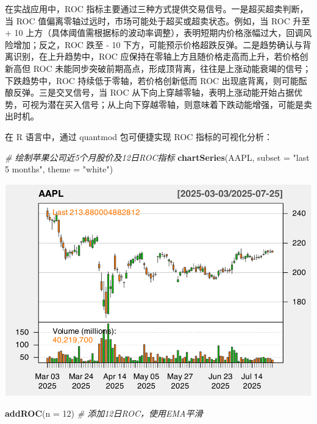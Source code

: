 \documentclass[]{ctexbook}
\newenvironment{Shaded}{\begin{snugshade}}{\end{snugshade}}
\newcommand{\AttributeTok}[1]{\textcolor[rgb]{0.13,0.29,0.53}{#1}}
\newcommand{\CommentTok}[1]{\textcolor[rgb]{0.56,0.35,0.01}{\textit{#1}}}
\newcommand{\DecValTok}[1]{\textcolor[rgb]{0.00,0.00,0.81}{#1}}
\newcommand{\FunctionTok}[1]{\textcolor[rgb]{0.13,0.29,0.53}{\textbf{#1}}}
\newcommand{\NormalTok}[1]{#1}
\newcommand{\StringTok}[1]{\textcolor[rgb]{0.31,0.60,0.02}{#1}}
\begin{document}
在实战应用中，ROC 指标主要通过三种方式提供交易信号。一是超买超卖判断，当 ROC 值偏离零轴过远时，市场可能处于超买或超卖状态。例如，当 ROC 升至 + 10 上方（具体阈值需根据标的波动率调整），表明短期内价格涨幅过大，回调风险增加；反之，ROC 跌至 - 10 下方，可能预示价格超跌反弹。二是趋势确认与背离识别，在上升趋势中，ROC 应保持在零轴上方且随价格走高而上升，若价格创新高但 ROC 未能同步突破前期高点，形成顶背离，往往是上涨动能衰竭的信号；下跌趋势中，ROC 持续低于零轴，若价格创新低而 ROC 出现底背离，则可能酝酿反弹。三是交叉信号，当 ROC 从下向上穿越零轴，表明上涨动能开始占据优势，可视为潜在买入信号；从上向下穿越零轴，则意味着下跌动能增强，可能是卖出时机。

在 R 语言中，通过 quantmod 包可便捷实现 ROC 指标的可视化分析：

\begin{Shaded}
\begin{Highlighting}[]
\CommentTok{\# 绘制苹果公司近5个月股价及12日ROC指标  }
\FunctionTok{chartSeries}\NormalTok{(AAPL, }\AttributeTok{subset =} \StringTok{"last 5 months"}\NormalTok{, }\AttributeTok{theme =} \StringTok{"white"}\NormalTok{)  }
\end{Highlighting}
\end{Shaded}

\includegraphics[width=0.9\linewidth]{QuantmodHandbook_files/figure-latex/roc-1}

\begin{Shaded}
\begin{Highlighting}[]
\FunctionTok{addROC}\NormalTok{(}\AttributeTok{n =} \DecValTok{12}\NormalTok{)  }\CommentTok{\# 添加12日ROC，使用EMA平滑  }
\end{Highlighting}
\end{Shaded}
\end{document}

